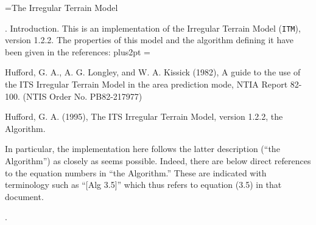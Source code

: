 




 \identicalpageheadstrue
 \def\letter#1{\hbox{\kern2em--- {\tt #1} ---}\smallskip}
 \newtoks\Title
 \def\Wtitle{\the\Title}

\Title={The Irregular Terrain Model}
\def\ITM{{\tt ITM}} \def\version{1.2.2}



.  Introduction.
     This is an implementation of the Irregular Terrain Model (\ITM),
version \version.  The properties of this model and the algorithm defining
it have been given in the references:
\begingroup \parindent=0pt \parskip=6pt plus2pt
   \frenchspacing \everypar={\hangindent=2pc}

Hufford, G. A., A. G. Longley, and W. A. Kissick (1982), A guide to the
  use of the ITS Irregular Terrain Model in the area prediction mode, NTIA
  Report 82-100.  (NTIS Order No. PB82-217977)

Hufford, G. A. (1995), The ITS Irregular Terrain Model, version 1.2.2,
  the Algorithm.

\endgroup
In particular, the implementation here follows the latter description
(``the Algorithm'') as closely as seems possible.  Indeed, there are below
direct references to the equation numbers in ``the Algorithm.''  These are
indicated with terminology such as ``[Alg 3.5]'' which thus refers to
equation (3.5) in that document.
\fi %

.

